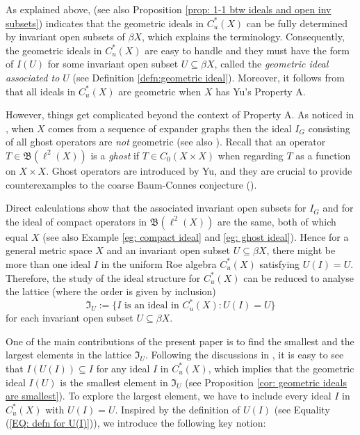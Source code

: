 \documentclass[12pt, a4paper]{amsart}
\numberwithin{equation}{section}
\theoremstyle{definition}
\theoremstyle{remark}
\def\B{\mathfrak{B}}
\begin{document}
As explained above, \cite[Theorem 6.3]{CW04} (see also Proposition \ref{prop: 1-1 btw ideals and open inv subsets}) indicates that the geometric ideals in $C^*_u(X)$ can be fully determined by invariant open subsets of $\beta X$, which explains the terminology. Consequently, the geometric ideals in $C^*_u(X)$ are easy to handle and they must have the form of $I(U)$ for some invariant open subset $U \subseteq \beta X$, called the \emph{geometric ideal associated to $U$} (see Definition \ref{defn:geometric ideal}). Moreover, it follows from \cite[Theorem 4.4]{CW05} that all ideals in $C^*_u(X)$ are geometric when $X$ has Yu's Property A. 


However, things get complicated beyond the context of Property A. As noticed in \cite[Remark 6.5]{CW04}, when $X$ comes from a sequence of expander graphs then the ideal $I_G$ consisting of all ghost operators are \emph{not} geometric (see also \cite{HLS02}). Recall that an operator $T \in \B(\ell^2(X))$ is a \emph{ghost} if $T \in C_0(X \times X)$ when regarding $T$ as a function on $X \times X$. Ghost operators are introduced by Yu, and they are crucial to provide counterexamples to the coarse Baum-Connes conjecture (\cite{HLS02}). 

Direct calculations show that the associated invariant open subsets for $I_G$ and for the ideal of compact operators in $\B(\ell^2(X))$ are the same, both of which equal $X$ (see also Example \ref{eg: compact ideal} and \ref{eg: ghost ideal}). Hence for a general metric space $X$ and an invariant open subset $U \subseteq \beta X$, there might be more than one ideal $I$ in the uniform Roe algebra $C^*_u(X)$ satisfying $U(I)=U$. Therefore, the study of the ideal structure for $C^*_u(X)$ can be reduced to analyse the lattice (where the order is given by inclusion)
\begin{equation}\label{EQ:set of ideals}
\mathfrak{I}_U:=\{I \mbox{~is~an~ideal~in~} C^*_u(X): U(I)=U\}
\end{equation}
for each invariant open subset $U \subseteq \beta X$.


One of the main contributions of the present paper is to find the smallest and the largest elements in the lattice $\mathfrak{I}_U$. Following the discussions in \cite{CW04}, it is easy to see that $I(U(I)) \subseteq I$ for any ideal $I$ in $C^*_u(X)$, which implies that the geometric ideal $I(U)$ is the smallest element in $\mathfrak{I}_U$ (see Proposition \ref{cor: geometric ideals are smallest}). To explore the largest element, we have to include every ideal $I$ in $C^*_u(X)$ with $U(I)=U$. Inspired by the definition of $U(I)$ (see Equality (\ref{EQ: defn for U(I)})), we introduce the following key notion:
\end{document}
